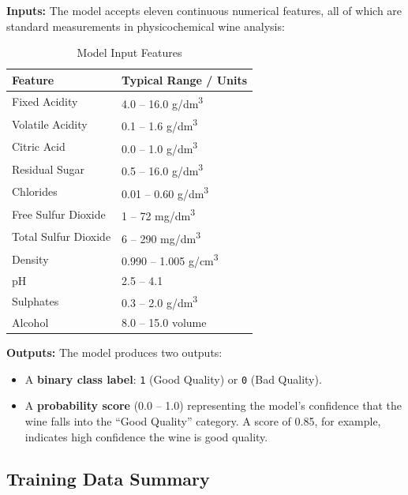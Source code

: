 \documentclass[11pt,a4paper]{article}
\begin{document}
\textbf{Inputs:} The model accepts eleven continuous numerical features, all of which are standard measurements in physicochemical wine analysis:

\begin{table}[H]
    \centering
    \caption{Model Input Features}
    \label{tab:inputs}
    \begin{tabularx}{\textwidth}{lX}
        \toprule
        \textbf{Feature} & \textbf{Typical Range / Units} \\
        \midrule
        Fixed Acidity & 4.0 -- 16.0 g/dm\textsuperscript{3} \\
        Volatile Acidity & 0.1 -- 1.6 g/dm\textsuperscript{3} \\
        Citric Acid & 0.0 -- 1.0 g/dm\textsuperscript{3} \\
        Residual Sugar & 0.5 -- 16.0 g/dm\textsuperscript{3} \\
        Chlorides & 0.01 -- 0.60 g/dm\textsuperscript{3} \\
        Free Sulfur Dioxide & 1 -- 72 mg/dm\textsuperscript{3} \\
        Total Sulfur Dioxide & 6 -- 290 mg/dm\textsuperscript{3} \\
        Density & 0.990 -- 1.005 g/cm\textsuperscript{3} \\
        pH & 2.5 -- 4.1 \\
        Sulphates & 0.3 -- 2.0 g/dm\textsuperscript{3} \\
        Alcohol & 8.0 -- 15.0 volume \\
        \bottomrule
    \end{tabularx}
\end{table}

\textbf{Outputs:} The model produces two outputs:
\begin{itemize}[leftmargin=*]
    \item A \textbf{binary class label}: \texttt{1} (Good Quality) or \texttt{0} (Bad Quality).
    \item A \textbf{probability score} (0.0 -- 1.0) representing the model's confidence that the wine falls into the ``Good Quality'' category. A score of 0.85, for example, indicates high confidence the wine is good quality.
\end{itemize}

\subsection{Training Data Summary}
\end{document}
